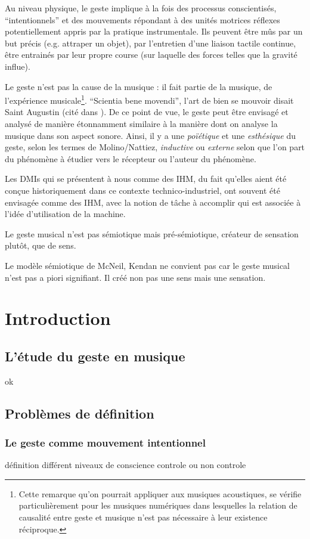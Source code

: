Au niveau physique, le geste implique à la fois des processus conscientisés, ``intentionnels'' et des mouvements répondant à des unités motrices réflexes potentiellement appris par la pratique instrumentale. Ils peuvent être mûs par un but précis (e.g. attraper un objet), par l'entretien d'une liaison tactile continue, être entrainés par leur propre course (sur laquelle des forces telles que la gravité influe).


Le geste n'est pas la cause de la musique : il fait partie de la musique, de l'expérience musicale\footnote{Cette remarque qu'on pourrait appliquer aux musiques acoustiques, se vérifie particulièrement pour les musiques numériques dans lesquelles la relation de causalité entre geste et musique n'est pas nécessaire à leur existence réciproque.}. ``Scientia bene movendi'', l'art de bien se mouvoir disait Saint Augustin (cité dans \cite{delalande_geste_1988}). De ce point de vue, le geste peut être envisagé et analysé de manière étonnamment similaire à la manière dont on analyse la musique dans son aspect sonore. Ainsi, il y a une \textit{poïétique} et une \textit{esthésique} du geste, selon les termes de Molino/Nattiez, \textit{inductive} ou \textit{externe} selon que l'on part du phénomène à étudier vers le récepteur ou l'auteur du phénomène. 

Les DMIs qui se présentent à nous comme des IHM, du fait qu'elles aient été conçue historiquement dans ce contexte technico-industriel, ont souvent été envisagée comme des IHM, avec la notion de tâche à accomplir qui est associée à l'idée d'utilisation de la machine.

Le geste musical n'est pas sémiotique mais pré-sémiotique, créateur de sensation plutôt, que de sens.


Le modèle sémiotique de McNeil, Kendan ne convient pas car le geste musical n'est pas a piori signifiant. Il créé non pas une sens mais une sensation.

\section{Introduction}
	\subsection{L'étude du geste en musique}
		ok
	\subsection{Problèmes de définition}
		\subsubsection{Le geste comme mouvement intentionnel}
			définition
			différent niveaux de conscience
			controle ou non controle

